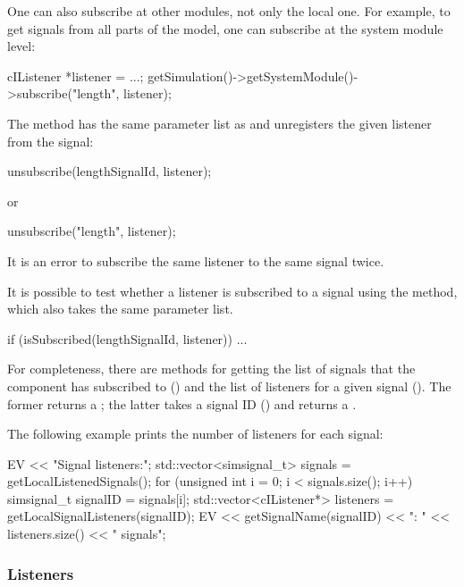 One can also subscribe at other modules, not only the local one.
For example, to get signals from all parts of the model,
one can subscribe at the system module level:

\begin{cpp}
cIListener *listener = ...;
getSimulation()->getSystemModule()->subscribe("length", listener);
\end{cpp}

The  method has the same parameter list
as  and unregisters the given listener
from the signal:

\begin{cpp}
unsubscribe(lengthSignalId, listener);
\end{cpp}

or

\begin{cpp}
unsubscribe("length", listener);
\end{cpp}

It is an error to subscribe the same listener to the same
signal twice.

It is possible to test whether a listener is subscribed to a signal
using the  method, which also takes the same
parameter list.

\begin{cpp}
if (isSubscribed(lengthSignalId, listener)) {
    ...
}
\end{cpp}

For completeness, there are methods for getting the list of signals
that the component has subscribed to ()
and the list of listeners for a given signal ().
The former returns a ; the latter takes
a signal ID () and returns a .

The following example prints the number of listeners for each signal:

\begin{cpp}
EV << "Signal listeners:\n";
std::vector<simsignal_t> signals = getLocalListenedSignals();
for (unsigned int i = 0; i < signals.size(); i++) {
    simsignal_t signalID = signals[i];
    std::vector<cIListener*> listeners = getLocalSignalListeners(signalID);
    EV << getSignalName(signalID) << ": " << listeners.size() << " signals\n";
}
\end{cpp}

\subsubsection{Listeners}
\label{sec:simple-modules:signal-listeners}

